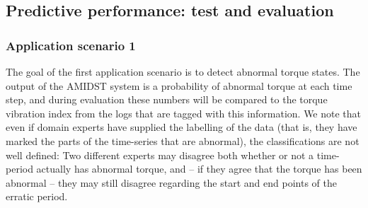 {%
%

}




\subsection{Predictive performance: test and evaluation}

\subsubsection{Application scenario 1}

The goal of the first application scenario is to detect abnormal torque states.  The output of the AMIDST system is a probability of abnormal torque at each time step, and during evaluation these numbers will be compared to the torque vibration index from the logs that are tagged with this information.  We note that even if domain experts have supplied the labelling of the data (that is, they have marked the parts of the time-series that are abnormal), the classifications are not well defined:  Two different experts may disagree both whether or not a time-period actually has abnormal torque, and -- if they agree that the torque has been abnormal -- they may still disagree regarding the start and end points of the erratic period.  

